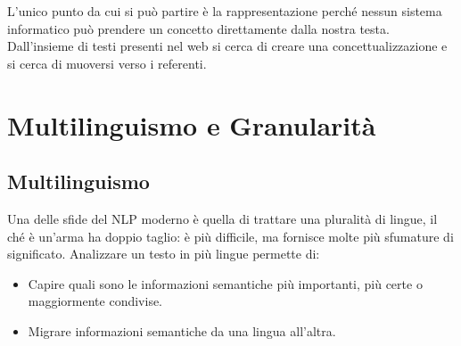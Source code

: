 




L'unico punto da cui si può partire è la rappresentazione perché nessun sistema informatico può prendere un concetto direttamente dalla nostra testa. Dall'insieme di testi presenti nel web si cerca di creare una concettualizzazione e si cerca di muoversi verso i referenti. 

\section{Multilinguismo e Granularità}

\subsection{Multilinguismo}

Una delle sfide del NLP moderno è quella di trattare una pluralità di lingue, il ché è un'arma ha doppio taglio: è più difficile, ma fornisce molte più sfumature di significato. Analizzare un testo in più lingue permette di:

\begin{itemize}
  \item Capire quali sono le informazioni semantiche più importanti, più certe o maggiormente condivise. 
  \item Migrare informazioni semantiche da una lingua all'altra.
\end{itemize}


